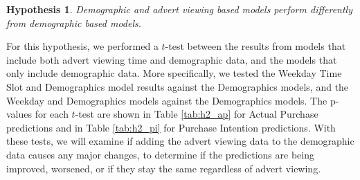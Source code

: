 \documentclass[review]{elsarticle}
\newtheorem{hyp}{Hypothesis}
\begin{document}
\begin{hyp}
\label{hyp:2}
Demographic and advert viewing based models perform differently from demographic based models.
\end{hyp}

For this hypothesis, we performed a \(t\)-test between the results from models that include both advert viewing time and demographic data, and the models that only include demographic data. More specifically, we tested the Weekday Time Slot and Demographics model results against the Demographics models, and the Weekday and Demographics models against the Demographics models. The p-values for each \(t\)-test are shown in Table \ref{tab:h2_ap} for Actual Purchase predictions and in Table \ref{tab:h2_pi} for Purchase Intention predictions. With these tests, we will examine if adding the advert viewing data to the demographic data causes any major changes, to determine if the predictions are being improved, worsened, or if they stay the same regardless of advert viewing.
\end{document}
